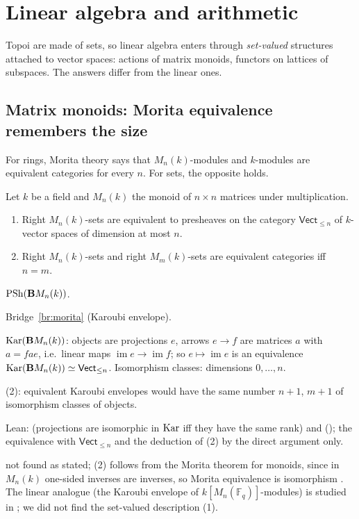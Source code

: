 \section{Linear algebra and arithmetic}\label{sec:linear}

Topoi are made of sets, so linear algebra enters through \emph{set-valued} structures attached to vector spaces: actions of matrix monoids, functors on lattices of subspaces. The answers differ from the linear ones.

\subsection{Matrix monoids: Morita equivalence remembers the size}

For rings, Morita theory says that $M_n(k)$-modules and $k$-modules are equivalent categories for every $n$. For sets, the opposite holds.

\begin{theorem}\label{th:matrixmorita}
Let $k$ be a field and $M_n(k)$ the monoid of $n\times n$ matrices under multiplication.
\begin{enumerate}
\item Right $M_n(k)$-sets are equivalent to presheaves on the category $\mathsf{Vect}_{\le n}$ of $k$-vector spaces of dimension at most $n$.
\item Right $M_n(k)$-sets and right $M_m(k)$-sets are equivalent categories iff $n = m$.
\end{enumerate}
\end{theorem}

\begin{trace}
\item[deck] $\mathrm{PSh}(\mathbf{B} M_n(k))$.
\item[arch] Bridge~\ref{br:morita} (Karoubi envelope).
\item[specialise] $\operatorname{Kar}(\mathbf{B} M_n(k))$: objects are projections $e$, arrows $e\to f$ are matrices $a$ with $a = fae$, i.e.\ linear maps $\operatorname{im}e\to\operatorname{im}f$; so $e\mapsto\operatorname{im}e$ is an equivalence $\operatorname{Kar}(\mathbf{B} M_n(k))\simeq\mathsf{Vect}_{\le n}$. Isomorphism classes: dimensions $0,\dots,n$.
\item[rewrite] (2): equivalent Karoubi envelopes would have the same number $n+1$, $m+1$ of isomorphism classes of objects.
\item[verify] Lean:  (projections are isomorphic in $\operatorname{Kar}$ iff they have the same rank) and  (); the equivalence with $\mathsf{Vect}_{\le n}$ and the deduction of (2) by the direct argument only.
\item[novelty] not found as stated; (2) follows from the Morita theorem for monoids, since in $M_n(k)$ one-sided inverses are inverses, so Morita equivalence is isomorphism \cite[Cor.~1.6.2]{rogers-thesis}. The linear analogue (the Karoubi envelope of $k[M_n(\mathbb F_q)]$-modules) is studied in \cite{kuhn}; we did not find the set-valued description (1).
\end{trace}

